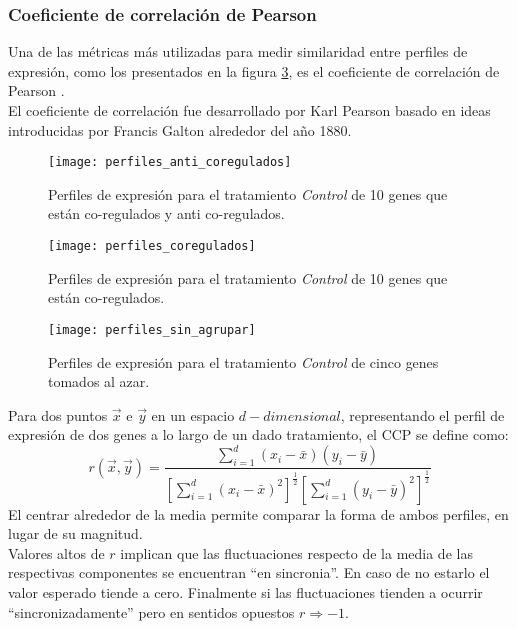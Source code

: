 \subsubsection{Coeficiente de correlación de Pearson}
Una de las métricas más utilizadas para medir similaridad entre perfiles de expresión, como los presentados en la figura \ref{fig:perfiles_sin_agrupar}, es el coeficiente de correlación de Pearson \cite{Babu2004}.\\
El coeficiente de correlación fue desarrollado por Karl Pearson basado en ideas introducidas por Francis Galton alrededor del año 1880.\\
\begin{figure*}[t!]
    \centering
    \begin{subfigure}[t]{0.33\textwidth}
    \centering
    \texttt{[image: perfiles\_anti\_coregulados]}
    \caption{Perfiles de expresión para el tratamiento \textit{Control} de 10 genes que están co-regulados y anti co-regulados.}
    \label{fig:perfiles_anti_coregulados}
    \end{subfigure}
    \begin{subfigure}[t]{0.33\textwidth}
    \centering
    \texttt{[image: perfiles\_coregulados]}
    \caption{Perfiles de expresión para el tratamiento \textit{Control} de 10 genes que están co-regulados.}
    \label{fig:perfiles_coregulados}
    \end{subfigure}
    \begin{subfigure}[t]{0.33\textwidth}
    \centering
    \texttt{[image: perfiles\_sin\_agrupar]}
    \caption{Perfiles de expresión para el tratamiento \textit{Control} de cinco genes tomados al azar.}
    \label{fig:perfiles_sin_agrupar}
    \end{subfigure}    
    \caption{Distintos grupos de perfiles de expresión}
\end{figure*}
Para dos puntos $\vec{x}$ e $\vec{y}$ en un espacio $d-dimensional$, representando el perfil de expresión de dos genes a lo largo de un dado tratamiento, el CCP se define como:
\begin{equation}
	r(\vec{x}, \vec{y}) = \frac{\sum\limits_{i=1}^d(x_i-\bar{x})(y_i-\bar{y})}{[\sum\limits_{i=1}^d(x_i-\bar{x})^2]^\frac{1}{2}[\sum\limits_{i=1}^d(y_i-\bar{y})^2]^\frac{1}{2}}
\end{equation}
El centrar alrededor de la media permite comparar la forma de ambos perfiles, en lugar de su magnitud.\\
Valores altos de $r$ implican que las fluctuaciones respecto de la media de las respectivas componentes se encuentran ``en sincronia''. En caso de no estarlo el valor esperado tiende a cero. Finalmente si las fluctuaciones tienden a ocurrir ``sincronizadamente'' pero en sentidos opuestos $r \Rightarrow -1$.\\

